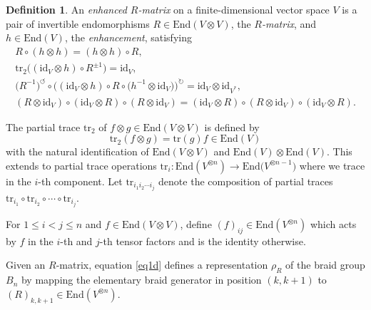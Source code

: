\documentclass[pdftex]{sigma}
\numberwithin{equation}{section}
\theoremstyle{definition}
\newtheorem{Definition}[Theorem]{Definition}
\begin{document}
\begin{Definition}
\label{def.Rh}
An \emph{enhanced $R$-matrix} on a finite-dimensional vector space $V$
is a pair of invertible endomorphisms $R \in \mathrm{End}(V\otimes V)$,
the \emph{$R$-matrix}, and $h \in \mathrm{End}(V)$, the \emph{enhancement}, satisfying
\begin{subequations}\label{eq1}
\begin{gather}
\label{eq1a}
R \circ (h \otimes h) = (h \otimes h) \circ R, \\
\label{eq1b}
\mathrm{tr}_{2} \bigl((\mathrm{id}_V \otimes h) \circ R^{\pm 1}\bigr) = \mathrm{id}_V, \\
\label{eq1c}
\bigl(R^{-1}\bigr)^{\circlearrowleft} \circ \bigl((\mathrm{id}_V \otimes h)
\circ R \circ \bigl(h^{-1} \otimes \mathrm{id}_V\bigr)\bigr)^{\circlearrowright} =
\mathrm{id}_V \otimes \mathrm{id}_{V^{\ast}}, \\
\label{eq1d}
(R \otimes \mathrm{id}_V) \circ (\mathrm{id}_V \otimes R)
\circ (R \otimes \mathrm{id}_V) = (\mathrm{id}_V \otimes R)
\circ (R \otimes \mathrm{id}_V) \circ (\mathrm{id}_V \otimes R).
\end{gather}
\end{subequations}
\end{Definition}

The partial trace $\mathrm{tr}_2$ of $f \otimes g \in \mathrm{End}(V \otimes V)$
is defined by
\begin{equation}
\label{tr2}
\mathrm{tr}_{2}(f \otimes g) = \mathrm{tr}(g) f \in \mathrm{End}(V)
\end{equation}
with the natural identification of $\mathrm{End}(V \otimes V)$ and
$\mathrm{End}(V) \otimes \mathrm{End}(V)$. {This extends to partial trace operations
$\mathrm{tr}_i\colon \mathrm{End}(V^{\otimes n})\to \mathrm{End}\bigl(V^{\otimes n-1}\bigr)$ where we trace in the $i$-th
component. Let $\mathrm{tr}_{i_1i_2\cdots i_j}$ denote the composition of partial traces
$\mathrm{tr}_{i_1}\circ\mathrm{tr}_{i_2}\circ\cdots\circ\mathrm{tr}_{i_j}$.}

For $1\leq i <j \leq n$ and $f\in\mathrm{End}(V\otimes V)$, define
$(f)_{ij}\in\mathrm{End}(V^{\otimes n})$ which acts by $f$ in the $i$-th and $j$-th
tensor factors and is the identity otherwise.

Given an $R$-matrix, equation \eqref{eq1d} defines a representation $\rho_R$ of
the braid group $B_n$ by mapping the elementary braid
generator in position $(k, k+1)$ to $(R)_{k,k+1}\in \mathrm{End}(V^{\otimes n})$.
\end{document}
